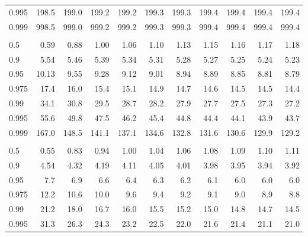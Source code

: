 \documentclass[]{article}
\begin{document}
\begin{table}[H]
\begin{tabular}{lrrrrrrrrrr}
\hspace{1em}0.995 & 198.5 & 199.0 & 199.2 & 199.2 & 199.3 & 199.3 & 199.4 & 199.4 & 199.4 & 199.4\\
\hspace{1em}0.999 & 998.5 & 999.0 & 999.2 & 999.2 & 999.3 & 999.3 & 999.4 & 999.4 & 999.4 & 999.4\\
\addlinespace[0.3em]
\multicolumn{11}{l}{\textbf{$k_2=3$}}\\
\hspace{1em}0.5 & 0.59 & 0.88 & 1.00 & 1.06 & 1.10 & 1.13 & 1.15 & 1.16 & 1.17 & 1.18\\
\hspace{1em}0.9 & 5.54 & 5.46 & 5.39 & 5.34 & 5.31 & 5.28 & 5.27 & 5.25 & 5.24 & 5.23\\
\hspace{1em}0.95 & 10.13 & 9.55 & 9.28 & 9.12 & 9.01 & 8.94 & 8.89 & 8.85 & 8.81 & 8.79\\
\hspace{1em}0.975 & 17.4 & 16.0 & 15.4 & 15.1 & 14.9 & 14.7 & 14.6 & 14.5 & 14.5 & 14.4\\
\hspace{1em}0.99 & 34.1 & 30.8 & 29.5 & 28.7 & 28.2 & 27.9 & 27.7 & 27.5 & 27.3 & 27.2\\
\hspace{1em}0.995 & 55.6 & 49.8 & 47.5 & 46.2 & 45.4 & 44.8 & 44.4 & 44.1 & 43.9 & 43.7\\
\hspace{1em}0.999 & 167.0 & 148.5 & 141.1 & 137.1 & 134.6 & 132.8 & 131.6 & 130.6 & 129.9 & 129.2\\
\addlinespace[0.3em]
\multicolumn{11}{l}{\textbf{$k_2=4$}}\\
\hspace{1em}0.5 & 0.55 & 0.83 & 0.94 & 1.00 & 1.04 & 1.06 & 1.08 & 1.09 & 1.10 & 1.11\\
\hspace{1em}0.9 & 4.54 & 4.32 & 4.19 & 4.11 & 4.05 & 4.01 & 3.98 & 3.95 & 3.94 & 3.92\\
\hspace{1em}0.95 & 7.7 & 6.9 & 6.6 & 6.4 & 6.3 & 6.2 & 6.1 & 6.0 & 6.0 & 6.0\\
\hspace{1em}0.975 & 12.2 & 10.6 & 10.0 & 9.6 & 9.4 & 9.2 & 9.1 & 9.0 & 8.9 & 8.8\\
\hspace{1em}0.99 & 21.2 & 18.0 & 16.7 & 16.0 & 15.5 & 15.2 & 15.0 & 14.8 & 14.7 & 14.5\\
\hspace{1em}0.995 & 31.3 & 26.3 & 24.3 & 23.2 & 22.5 & 22.0 & 21.6 & 21.4 & 21.1 & 21.0\\

\end{tabular}
\end{table}
\end{document}
